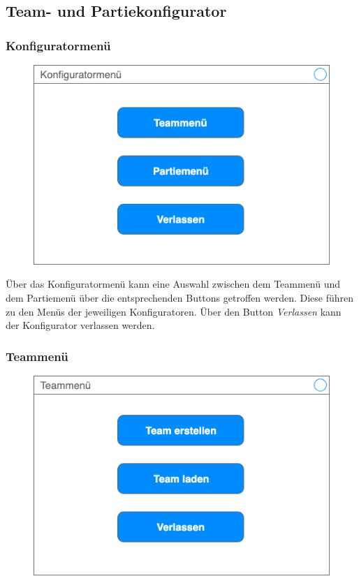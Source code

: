 \subsection{Team- und Partiekonfigurator}

    \subsubsection{Konfiguratormenü}

    \begin{figure}[H]
        \centering
        \includegraphics[width=\textwidth/2]{images/konfiguratormenue}
    \end{figure}

    Über das Konfiguratormenü kann eine Auswahl zwischen dem Teammenü und dem Partiemenü über die entsprechenden Buttons getroffen werden. Diese führen zu den Menüs der jeweiligen Konfiguratoren. Über den Button \textit{Verlassen} kann der Konfigurator verlassen werden.

    \subsubsection{Teammenü}
    \begin{figure}[H]
        \centering
        \includegraphics[width=\textwidth/2]{images/teammenue}
    \end{figure}

